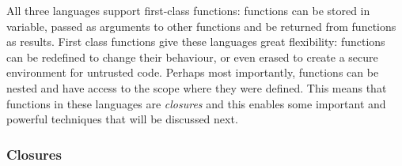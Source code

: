 


All three languages support first-class functions: functions can be stored
in variable, passed as arguments to other functions and be returned
from functions as results. First class functions give these languages
great flexibility: functions can be redefined to change their behaviour,
or even erased to create a secure environment for untrusted code. Perhaps
most importantly, functions can be nested and have access to the scope where
they were defined. This means that functions in these languages are \emph{closures}
and this enables some important and powerful techniques that will be discussed next.

\subsubsection{Closures}
\label{closures}



